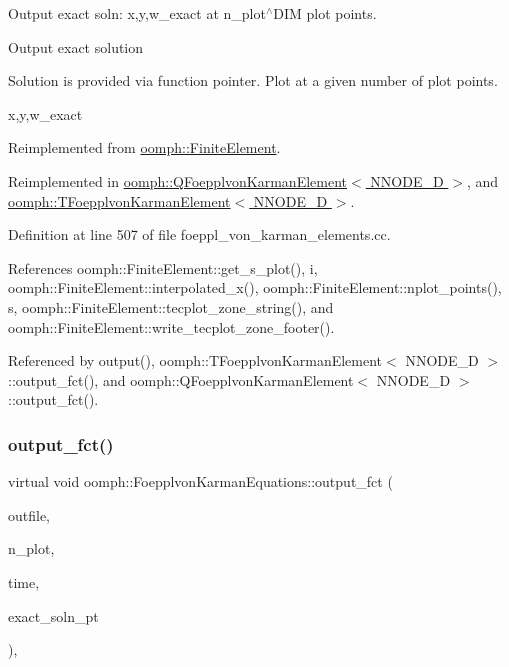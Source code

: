 Output exact soln\+: x,y,w\+\_\+exact at n\+\_\+plot$^\wedge$\+D\+IM plot points. 

Output exact solution

Solution is provided via function pointer. Plot at a given number of plot points.

x,y,w\+\_\+exact 

Reimplemented from \hyperlink{classoomph_1_1FiniteElement_a22b695c714f60ee6cd145be348042035}{oomph\+::\+Finite\+Element}.



Reimplemented in \hyperlink{classoomph_1_1QFoepplvonKarmanElement_a8bfd0ab0a5a7726f154deec3bde0a22b}{oomph\+::\+Q\+Foepplvon\+Karman\+Element$<$ N\+N\+O\+D\+E\+\_\+D $>$}, and \hyperlink{classoomph_1_1TFoepplvonKarmanElement_a8b321da1c5d766fc40ee502b82c6f47d}{oomph\+::\+T\+Foepplvon\+Karman\+Element$<$ N\+N\+O\+D\+E\+\_\+D $>$}.



Definition at line 507 of file foeppl\+\_\+von\+\_\+karman\+\_\+elements.\+cc.



References oomph\+::\+Finite\+Element\+::get\+\_\+s\+\_\+plot(), i, oomph\+::\+Finite\+Element\+::interpolated\+\_\+x(), oomph\+::\+Finite\+Element\+::nplot\+\_\+points(), s, oomph\+::\+Finite\+Element\+::tecplot\+\_\+zone\+\_\+string(), and oomph\+::\+Finite\+Element\+::write\+\_\+tecplot\+\_\+zone\+\_\+footer().



Referenced by output(), oomph\+::\+T\+Foepplvon\+Karman\+Element$<$ N\+N\+O\+D\+E\+\_\+D $>$\+::output\+\_\+fct(), and oomph\+::\+Q\+Foepplvon\+Karman\+Element$<$ N\+N\+O\+D\+E\+\_\+D $>$\+::output\+\_\+fct().

\mbox{\label{classoomph_1_1FoepplvonKarmanEquations_a3eecb6536ce104ef6fbf3602b306bd37}} 
\subsubsection{\texorpdfstring{output\+\_\+fct()}{output\_fct()}\hspace{0.1cm}{\footnotesize\ttfamily [2/2]}}
{\footnotesize\ttfamily virtual void oomph\+::\+Foepplvon\+Karman\+Equations\+::output\+\_\+fct (\begin{DoxyParamCaption}\item[{std\+::ostream \&}]{outfile,  }\item[{const unsigned \&}]{n\+\_\+plot,  }\item[{const double \&}]{time,  }\item[{\hyperlink{classoomph_1_1FiniteElement_ad4ecf2b61b158a4b4d351a60d23c633e}{Finite\+Element\+::\+Unsteady\+Exact\+Solution\+Fct\+Pt}}]{exact\+\_\+soln\+\_\+pt }\end{DoxyParamCaption})\hspace{0.3cm}{\ttfamily [inline]}, {\ttfamily [virtual]}}



